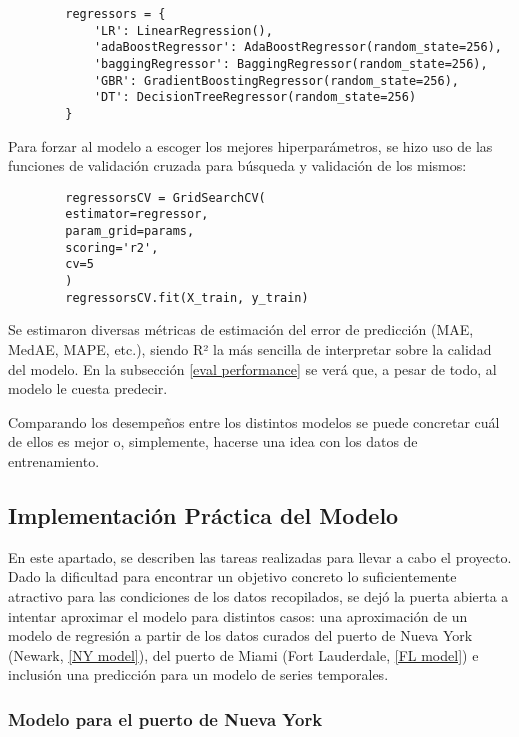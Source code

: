 \documentclass[12pt]{article}
\begin{document}
	\begin{verbatim}
		regressors = {
			'LR': LinearRegression(),
			'adaBoostRegressor': AdaBoostRegressor(random_state=256),
			'baggingRegressor': BaggingRegressor(random_state=256),
			'GBR': GradientBoostingRegressor(random_state=256),
			'DT': DecisionTreeRegressor(random_state=256)
		}
	\end{verbatim}

	Para forzar al modelo a escoger los mejores hiperparámetros, se hizo uso de las funciones de validación cruzada para búsqueda y validación de los mismos:
	
	\begin{verbatim}
		regressorsCV = GridSearchCV(
		estimator=regressor,
		param_grid=params,
		scoring='r2',
		cv=5
		)
		regressorsCV.fit(X_train, y_train)
	\end{verbatim}

	Se estimaron diversas métricas de estimación del error de predicción (MAE, MedAE, MAPE, etc.), siendo R² la más sencilla de interpretar sobre la calidad del modelo. En la subsección \ref{eval performance} se verá que, a pesar de todo, al modelo le cuesta predecir.
	
	Comparando los desempeños entre los distintos modelos se puede concretar cuál de ellos es mejor o, simplemente, hacerse una idea con los datos de entrenamiento.
	
	\subsection{\label{implementacionPractica}Implementación Práctica del Modelo}
 	En este apartado, se describen las tareas realizadas para llevar a cabo el proyecto. Dado la dificultad para encontrar un objetivo concreto lo suficientemente atractivo para las condiciones de los datos recopilados, se dejó la puerta abierta a intentar aproximar el modelo para distintos casos: una aproximación de un modelo de regresión a partir de los datos curados del puerto de Nueva York (Newark, \ref{NY model}), del puerto de Miami (Fort Lauderdale, \ref{FL model}) e inclusión una predicción para un modelo de series temporales.
 	
 	\subsubsection{\label{NY model} Modelo para el puerto de Nueva York}
 	
\end{document}
